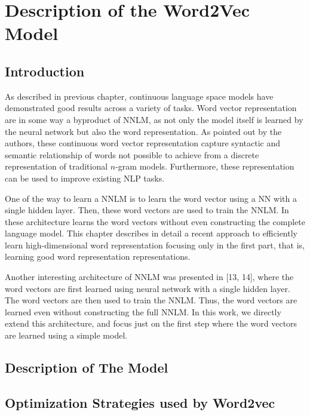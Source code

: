 \chapter{Description of the Word2Vec Model }
\label{chap:word2vec_description}


\section{Introduction}
As described in  previous chapter,  continuous language space models have
demonstrated good results across a variety of tasks. Word vector
representation are in some way a byproduct of \ac{NNLM}, as not only the
model itself is learned by the neural network but also the word representation.  As pointed out by
the authors, these continuous word vector representation capture syntactic
and semantic relationship of words not possible to achieve from a discrete
representation of traditional $n$-gram models. Furthermore, these
representation can be used to improve existing \ac{NLP} tasks.

One of the way to learn a \ac{NNLM} is to learn the word vector using a
\ac{NN} with a single hidden layer. Then, these word vectors are used to
train the \ac{NNLM}. In these architecture learns the word vectors without
even constructing the complete language model.  This chapter describes in
detail a recent approach  to efficiently learn
high-dimensional word representation \cite{DBLP:journals/corr/abs-1301-3781}
focusing only in the first part, that is, learning good word representation
representations.

Another interesting architecture of NNLM was presented in [13, 14], where the word vectors are
ﬁrst learned using neural network with a single hidden layer. The word vectors are then used to train
the NNLM. Thus, the word vectors are learned even without constructing the full NNLM. In this
work, we directly extend this architecture, and focus just on the ﬁrst step where the word vectors are
learned using a simple model.

\section{Description of The Model}


\section{Optimization Strategies used by Word2vec}
\label{sec:strategies_improve_time}

